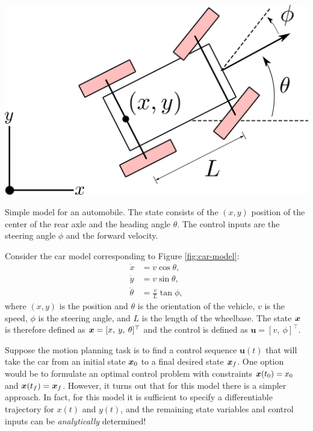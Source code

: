 \begin{example} \label{ex:carflatness}
\theoremstyle{definition}
\begin{marginfigure}
    \centering 
    \includegraphics[width=0.95\linewidth]{tex/figs/ch02_figs/car.png}
    \caption{Simple model for an automobile. The state consists of the $(x,y)$ position of the center of the rear axle and the heading angle $\theta$. The control inputs are the steering angle $\phi$ and the forward velocity.}
    \label{fig:car-model} 
\end{marginfigure} 
Consider the car model corresponding to Figure \ref{fig:car-model}:
\begin{equation} \label{eq:car-dynamics}
\begin{split}
    \dot{x} &= v\cos\theta,\\
    \dot{y} &= v\sin\theta,\\
    \dot{\theta} &= \frac{v}{L}\tan\phi, 
\end{split}
\end{equation}
where $(x, y)$ is the position and $\theta$ is the orientation of the vehicle, $v$ is the speed, $\phi$ is the steering angle, and $L$ is the length of the wheelbase. The state $\bm{x}$ is therefore defined as $\bm{x} = [x, \: y, \: \theta]^\top $ and the control is defined as $\bm{u} = [v, \:\phi]^\top $.

Suppose the motion planning task is to find a control sequence $\bm{u}(t)$ that will take the car from an initial state $\bm{x}_0$ to a final desired state $\bm{x}_{f}$. One option would be to formulate an optimal control problem with constraints $\bm{x}(t_0) = x_0$ and $\bm{x}(t_f) = \bm{x}_f$. However, it turns out that for this model there is a simpler approach. In fact, for this model it is sufficient to specify a differentiable trajectory for $x(t)$ and $y(t)$, and the remaining state variables and control inputs can be \textit{analytically} determined!


\end{example}
